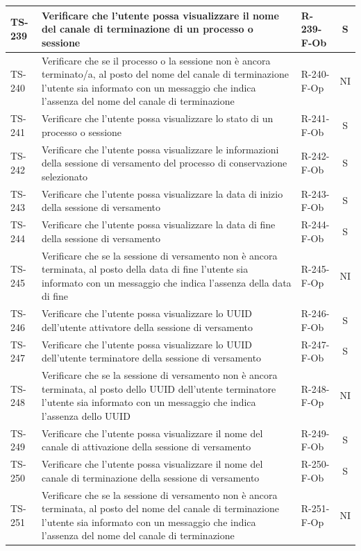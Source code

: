 \documentclass[a4paper,12pt]{article}
\begin{document}
\begin{longtable}{|p{1.5cm}|p{8.3cm}|p{2.4cm}|c|}
\hline
TS-239 & Verificare che l'utente possa visualizzare il nome del canale di terminazione di un processo o sessione & R-239-F-Ob & S \\
\hline
TS-240 & Verificare che se il processo o la sessione non è ancora terminato/a, al posto del nome del canale di terminazione l'utente sia informato con un messaggio che indica l'assenza del nome del canale di terminazione & R-240-F-Op & NI \\
\hline
TS-241 & Verificare che l'utente possa visualizzare lo stato di un processo o sessione & R-241-F-Ob & S \\
\hline
TS-242 & Verificare che l'utente possa visualizzare le informazioni della sessione di versamento del processo di conservazione selezionato & R-242-F-Ob & S \\
\hline
TS-243 & Verificare che l'utente possa visualizzare la data di inizio della sessione di versamento & R-243-F-Ob & S \\
\hline
TS-244 & Verificare che l'utente possa visualizzare la data di fine della sessione di versamento & R-244-F-Ob & S \\
\hline
TS-245 & Verificare che se la sessione di versamento non è ancora terminata, al posto della data di fine l'utente sia informato con un messaggio che indica l'assenza della data di fine & R-245-F-Op & NI \\
\hline
TS-246 & Verificare che l'utente possa visualizzare lo UUID dell'utente attivatore della sessione di versamento & R-246-F-Ob & S \\
\hline
TS-247 & Verificare che l'utente possa visualizzare lo UUID dell'utente terminatore della sessione di versamento & R-247-F-Ob & S \\
\hline
TS-248 & Verificare che se la sessione di versamento non è ancora terminata, al posto dello UUID dell'utente terminatore l'utente sia informato con un messaggio che indica l'assenza dello UUID & R-248-F-Op & NI \\
\hline
TS-249 & Verificare che l'utente possa visualizzare il nome del canale di attivazione della sessione di versamento & R-249-F-Ob & S \\
\hline
TS-250 & Verificare che l'utente possa visualizzare il nome del canale di terminazione della sessione di versamento & R-250-F-Ob & S \\
\hline
TS-251 & Verificare che se la sessione di versamento non è ancora terminata, al posto del nome del canale di terminazione l'utente sia informato con un messaggio che indica l'assenza del nome del canale di terminazione & R-251-F-Op & NI \\

\end{longtable}
\end{document}
